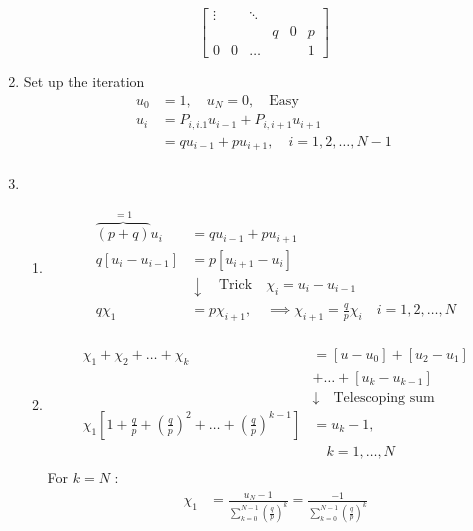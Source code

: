 \documentclass{article}
\theoremstyle{remark}
\begin{document}
\begin{enumerate}
\[\begin{bmatrix}
     \vdots   &  &   \ddots    \\
      &  &  & q  & 0  &  p \\
     0  &  0  &  \ldots  &   &  & 1
     \end{bmatrix} 
     \] 
   \item Set up the iteration \[
   \begin{split}
     u _{0}  & = 1 , \quad  u_{N} = 0 , \quad  \text{Easy}   \\
     u_{i} &=  P_{i, i.1} u_{i-1} + P _{i,i+1} u_{i+1}  \\
     &= q u_{i-1} + p u_{i+1} , \quad i=1,2, \ldots, N-1  \\
   \end{split} 
   \] 
 \item 
   \begin{enumerate}
     \item  \[
         \begin{split}
           \overbrace{(p + q)}^{ = 1} u_{i}   & = q u_{i -1} + p u_{i+1} \\
    q\left[ u _{ i} - u_{i-1} \right] &=  p \left[ u_{i+1} - u_{i} \right] \\
      &  \downarrow \quad \text{Trick}    \quad \chi _{i} = u_{i} - u_{i-1}   \\
    q \chi _{1} &=  p \chi _{i+1} , \quad  \implies  \chi _{i+1} = \frac{q}{p}  \chi _{i}  \quad  i = 1,2 , \ldots , N  \\
         \end{split} 
     \] 
   \item \[
   \begin{split}
     \chi _{1} + \chi _{2} + \ldots + \chi _{k} &= \left[ u - u_{0} \right] + \left[ u_{2} - u_{1} \right] \\
      & + \ldots + \left[ u_{k} - u_{k-1} \right] \\
       &  \downarrow  \quad \text{Telescoping sum}  \\
        \chi _{1}\left[ 1 + \frac{q}{p} + \left( \frac{q}{p} \right)^2 + \ldots + \left( \frac{q}{p} \right)^{k-1}  \right]&=  u_{k} -1, \\
        &  \quad k = 1,\ldots,N  \\
   \end{split} 
   \] 
   For $k = N$ : \[
   \begin{split}
     \chi _{1} &=    \frac{u_{N} -1}{\sum_{k=0}^{N-1} \left( \frac{q}{p} \right)^{k}}  = \frac{-1}{ \sum_{k = 0}^{N-1}  \left( \frac{q}{p} \right)^{k}}   \\

\end{split}\]
\end{enumerate}
\end{enumerate}
\end{document}
